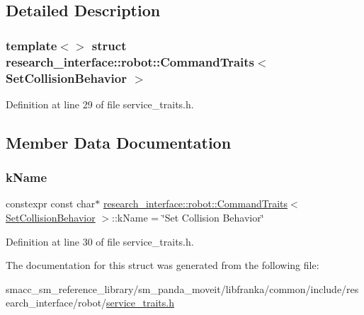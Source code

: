 \subsection{Detailed Description}
\subsubsection*{template$<$$>$\newline
struct research\+\_\+interface\+::robot\+::\+Command\+Traits$<$ Set\+Collision\+Behavior $>$}



Definition at line 29 of file service\+\_\+traits.\+h.



\subsection{Member Data Documentation}
\mbox{\label{structresearch__interface_1_1robot_1_1CommandTraits_3_01SetCollisionBehavior_01_4_a9656bf4cfea6a95a7df606599c45d52a}} 
\subsubsection{\texorpdfstring{k\+Name}{kName}}
{\footnotesize\ttfamily constexpr const char$\ast$ \hyperlink{structresearch__interface_1_1robot_1_1CommandTraits}{research\+\_\+interface\+::robot\+::\+Command\+Traits}$<$ \hyperlink{structresearch__interface_1_1robot_1_1SetCollisionBehavior}{Set\+Collision\+Behavior} $>$\+::k\+Name = \char`\"{}Set Collision Behavior\char`\"{}\hspace{0.3cm}{\ttfamily [static]}}



Definition at line 30 of file service\+\_\+traits.\+h.



The documentation for this struct was generated from the following file\+:\begin{DoxyCompactItemize}
\item 
smacc\+\_\+sm\+\_\+reference\+\_\+library/sm\+\_\+panda\+\_\+moveit/libfranka/common/include/research\+\_\+interface/robot/\hyperlink{service__traits_8h}{service\+\_\+traits.\+h}\end{DoxyCompactItemize}
